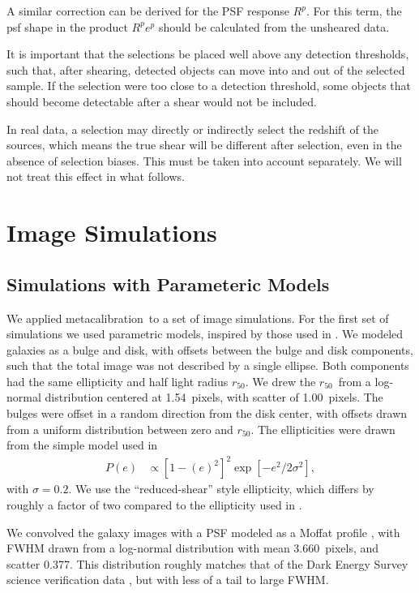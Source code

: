 \documentclass[usegraphicx,usenatbib]{mn2e}
\newcommand{\hlr}{$r_{50}$}
\newcommand{\hlrmean}{1.54}
\newcommand{\hlrwidth}{1.00}
\newcommand{\psffwhmmean}{3.660}
\newcommand{\psffwhmwidth}{0.377}
\newcommand{\mcal}{metacalibration}
\newcommand{\mcalRpsf}{$R^{p}$}
\begin{document}
A similar correction can be derived for the PSF response \mcalRpsf.  For this
term, the psf shape in the product $\mbox{\mcalRpsf} e^p$ should be calculated
from the unsheared data.

It is important that the selections be placed well above any detection
thresholds, such that, after shearing, detected objects can move into and out
of the selected sample.  If the selection were too close to a detection
threshold, some objects that should become detectable after
a shear would not be included.

In real data, a selection may directly or indirectly select the redshift of the
sources, which means the true shear will be different after selection, even
in the absence of selection biases.  This must be taken into account separately. We
will not treat this effect in what follows.


\section{Image Simulations} \label{sec:sims}

\subsection{Simulations with Parameteric Models} \label{sec:bdsim}

We applied \mcal\ to a set of image simulations.  For the first set of
simulations we used parametric models, inspired by those used in
\citet{bfd2015}.  We modeled galaxies as a bulge and disk, with offsets between the
bulge and disk components, such that the total image was not described by a
single ellipse.  Both components had the same ellipticity and half light radius
\hlr. We drew the \hlr\ from a log-normal distribution centered at \hlrmean\
pixels, with scatter of \hlrwidth\ pixels.  The bulges were offset in a random
direction from the disk center, with offsets drawn from a uniform distribution
between zero and \hlr.  The ellipticities were drawn from the simple model
used in \cite{ba14}
\begin{align}
    P(e) &\propto \left[1-(e)^2\right]^2 \exp\left[-e^2/2\sigma^2\right],
\end{align}
with $\sigma=0.2$.  We use the ``reduced-shear'' style ellipticity,
which differs by roughly a factor of two compared to the ellipticity used
in \citet{bfd2015}.

We convolved the galaxy images with a PSF modeled as a Moffat profile
\citep{Moffat1969}, with FWHM drawn from a log-normal distribution with mean
\psffwhmmean\ pixels, and scatter \psffwhmwidth. This distribution roughly
matches that of the Dark Energy Survey science verification data
\citep[][(DES)]{DESSVShear}, but with less of a tail to large FWHM.
\end{document}
